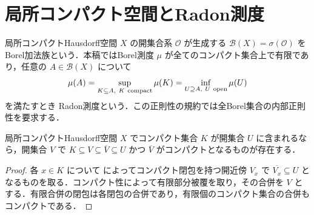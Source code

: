 \section{局所コンパクト空間とRadon測度}
\begin{defn}[Borel加法族とRadon測度]
局所コンパクトHausdorff空間 $X$ の開集合系 $\mathcal O$ が生成する $\mathcal B(X)=\sigma(\mathcal O)$ をBorel加法族という．本稿ではBorel測度 $\mu$ が全てのコンパクト集合上で有限であり，任意の $A\in\mathcal B(X)$ について
\[
\mu(A)=\sup_{K\subseteq A,\ K\ {\rm compact}}\mu(K)=\inf_{U\supseteq A,\ U\ {\rm open}}\mu(U)
\]
を満たすとき Radon測度という．この正則性の規約では全Borel集合の内部正則性を要求する．
\end{defn}
\begin{prop}[コンパクト集合を含む開近傍の縮小]
局所コンパクトHausdorff空間 $X$ でコンパクト集合 $K$ が開集合 $U$ に含まれるなら，開集合 $V$ で $K\subseteq V\subseteq\overline V\subseteq U$ かつ $\overline V$ がコンパクトとなるものが存在する．
\end{prop}
\begin{proof}
各 $x\in K$ について  によってコンパクト閉包を持つ開近傍 $V_x$ で $\overline{V_x}\subseteq U$ となるものを取る．コンパクト性によって有限部分被覆を取り，その合併を $V$ とする．有限合併の閉包は各閉包の合併であり，有限個のコンパクト集合の合併もコンパクトである．
\end{proof}
